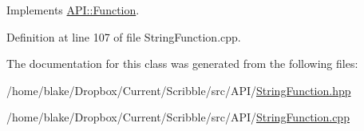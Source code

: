 Implements \hyperlink{class_a_p_i_1_1_function_ae56761ad4c849c05e12cb4cd02583c77}{A\-P\-I\-::\-Function}.



Definition at line 107 of file String\-Function.\-cpp.



The documentation for this class was generated from the following files\-:\begin{DoxyCompactItemize}
\item 
/home/blake/\-Dropbox/\-Current/\-Scribble/src/\-A\-P\-I/\hyperlink{_string_function_8hpp}{String\-Function.\-hpp}\item 
/home/blake/\-Dropbox/\-Current/\-Scribble/src/\-A\-P\-I/\hyperlink{_string_function_8cpp}{String\-Function.\-cpp}\end{DoxyCompactItemize}
